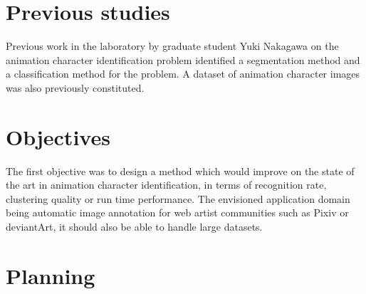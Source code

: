 \section{Previous studies}
Previous work in the laboratory by graduate student Yuki Nakagawa on the animation character identification problem identified a segmentation method\cite{felzenszwalb2004efficient} and a classification method\cite{harchaoui2007image} for the problem. A dataset of animation character images was also previously constituted.
\section{Objectives}
The first objective was to design a method which would improve on the state of the art in animation character identification, in terms of recognition rate, clustering quality or run time performance. The envisioned application domain being automatic image annotation for web artist communities such as Pixiv\footnotemark[1]
 or deviantArt\footnotemark[2],
it should also be able to handle large datasets.
\section{Planning}